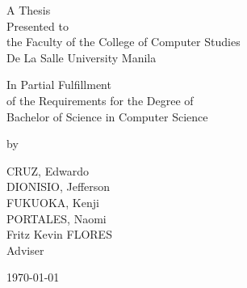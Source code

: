 %
%
%                 

\begin{titlepage}
\centering



\vspace{1.75cm}
A Thesis\\
Presented to\\
the Faculty of the College of Computer Studies\\
De La Salle University Manila

\vspace{1.75cm}
In Partial Fulfillment\\
of the Requirements for the Degree of\\
Bachelor of  Science in Computer Science

\vspace{1.75cm}
by\\
\vspace{1cm}

CRUZ, Edwardo \\
DIONISIO, Jefferson  \\
FUKUOKA, Kenji  \\
PORTALES, Naomi  \\

\vspace{1.75cm}
Fritz Kevin FLORES \\
Adviser

\vspace{1.75cm}
\today
\end{titlepage}
